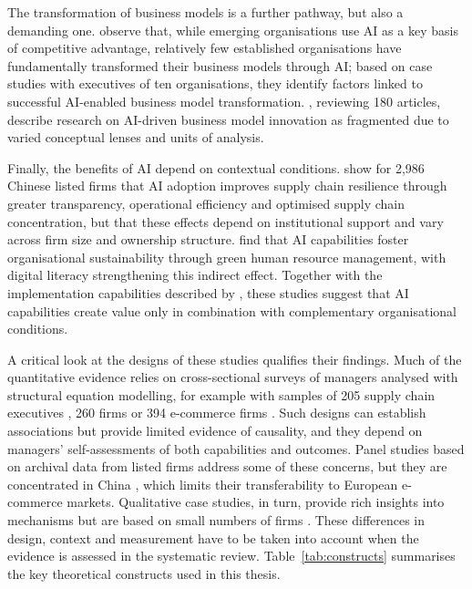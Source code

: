 The transformation of business models is a further pathway, but also a demanding one. \textcite[1]{black2024} observe that, while emerging organisations use AI as a key basis of competitive advantage, relatively few established organisations have fundamentally transformed their business models through AI; based on case studies with executives of ten organisations, they identify factors linked to successful AI-enabled business model transformation. \textcite[1]{jorzik2024}, reviewing 180 articles, describe research on AI-driven business model innovation as fragmented due to varied conceptual lenses and units of analysis.

Finally, the benefits of AI depend on contextual conditions. \textcite[1]{dai2026} show for 2,986 Chinese listed firms that AI adoption improves supply chain resilience through greater transparency, operational efficiency and optimised supply chain concentration, but that these effects depend on institutional support and vary across firm size and ownership structure. \textcite[1]{ali2025} find that AI capabilities foster organisational sustainability through green human resource management, with digital literacy strengthening this indirect effect. Together with the implementation capabilities described by \textcite[1549]{weber2023}, these studies suggest that AI capabilities create value only in combination with complementary organisational conditions.

A critical look at the designs of these studies qualifies their findings. Much of the quantitative evidence relies on cross-sectional surveys of managers analysed with structural equation modelling, for example with samples of 205 supply chain executives \parencite[1]{fossowamba2022}, 260 firms \parencite[10]{li2025} or 394 e-commerce firms \parencite[1]{chen2022}. Such designs can establish associations but provide limited evidence of causality, and they depend on managers' self-assessments of both capabilities and outcomes. Panel studies based on archival data from listed firms address some of these concerns, but they are concentrated in China \parencites[1]{liang2026}[1]{huang2026}[1]{dai2026}, which limits their transferability to European e-commerce markets. Qualitative case studies, in turn, provide rich insights into mechanisms but are based on small numbers of firms \parencites[574]{sjodin2021}[1]{black2024}. These differences in design, context and measurement have to be taken into account when the evidence is assessed in the systematic review. Table~\ref{tab:constructs} summarises the key theoretical constructs used in this thesis.

